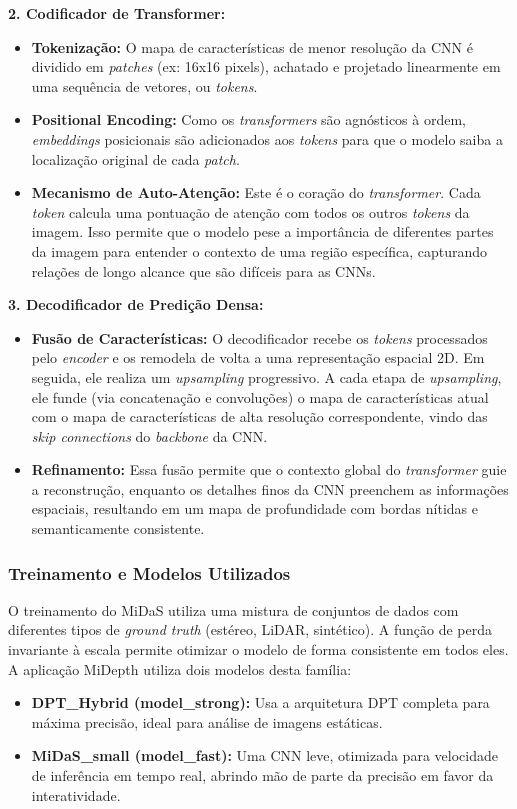 \documentclass{SBCbookchapter}
\newcommand{\nomeProjeto}{MiDepth }
\begin{document}
    \textbf{2. Codificador de Transformer:}
    \begin{itemize}
        \item \textbf{Tokenização:} O mapa de características de menor resolução da CNN é dividido em \textit{patches} (ex: 16x16 pixels), achatado e projetado linearmente em uma sequência de vetores, ou \textit{tokens}.
        \item \textbf{Positional Encoding:} Como os \textit{transformers} são agnósticos à ordem, \textit{embeddings} posicionais são adicionados aos \textit{tokens} para que o modelo saiba a localização original de cada \textit{patch}.
        \item \textbf{Mecanismo de Auto-Atenção:} Este é o coração do \textit{transformer}. Cada \textit{token} calcula uma pontuação de atenção com todos os outros \textit{tokens} da imagem. Isso permite que o modelo pese a importância de diferentes partes da imagem para entender o contexto de uma região específica, capturando relações de longo alcance que são difíceis para as CNNs.
    \end{itemize}

    \textbf{3. Decodificador de Predição Densa:}
    \begin{itemize}
        \item \textbf{Fusão de Características:} O decodificador recebe os \textit{tokens} processados pelo \textit{encoder} e os remodela de volta a uma representação espacial 2D. Em seguida, ele realiza um \textit{upsampling} progressivo. A cada etapa de \textit{upsampling}, ele funde (via concatenação e convoluções) o mapa de características atual com o mapa de características de alta resolução correspondente, vindo das \textit{skip connections} do \textit{backbone} da CNN.
        \item \textbf{Refinamento:} Essa fusão permite que o contexto global do \textit{transformer} guie a reconstrução, enquanto os detalhes finos da CNN preenchem as informações espaciais, resultando em um mapa de profundidade com bordas nítidas e semanticamente consistente.
    \end{itemize}
    

    \subsubsection{Treinamento e Modelos Utilizados}
    O treinamento do MiDaS utiliza uma mistura de conjuntos de dados com diferentes tipos de \textit{ground truth} (estéreo, LiDAR, sintético). A função de perda invariante à escala permite otimizar o modelo de forma consistente em todos eles. A aplicação \nomeProjeto utiliza dois modelos desta família:
    \begin{itemize}
        \item \textbf{DPT\_Hybrid (model\_strong):} Usa a arquitetura DPT completa para máxima precisão, ideal para análise de imagens estáticas.
        \item \textbf{MiDaS\_small (model\_fast):} Uma CNN leve, otimizada para velocidade de inferência em tempo real, abrindo mão de parte da precisão em favor da interatividade.
    \end{itemize}
\end{document}

